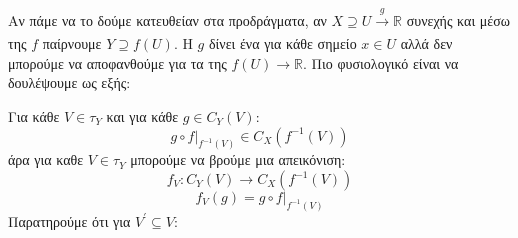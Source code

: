 \begin{figure}[H]
    \centering
\end{figure}

\noindent Αν πάμε να το δούμε κατευθείαν στα προδράγματα, αν $X\supseteq U \xrightarrow[]{g} \mathbb{R}$ συνεχής και μέσω της $f$ παίρνουμε $Y \supseteq f(U)$. Η $g$ δίνει ένα  για κάθε σημείο $x \in U$ αλλά δεν μπορούμε να αποφανθούμε για τα  της $f(U)\rightarrow \mathbb{R}$. Πιο φυσιολογικό είναι να δουλέψουμε ως εξής:

\begin{figure}[H]
    \centering
\end{figure}

\noindent Για κάθε $V\in \tau_Y$ και για κάθε $g \in C_Y (V)$:
$$g\circ f|_{f^{-1}(V)} \in C_X(f^{-1}(V))$$ άρα για καθε $V\in \tau_Y$ μπορούμε να βρούμε μια απεικόνιση:
$$f_V : C_Y(V) \longrightarrow C_X(f^{-1}(V)) $$
$$f_V(g) = g\circ f|_{f^{-1}(V)}$$ Παρατηρούμε ότι για $V^{\prime} \subseteq V$:

\begin{figure}[H]
    \centering
\end{figure}

